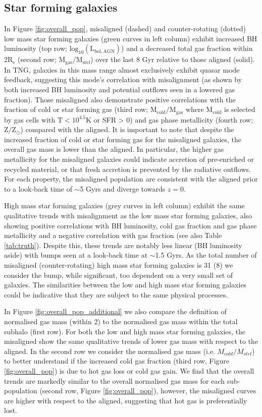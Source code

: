 \subsection{Star forming galaxies}
In Figure \ref{fig:overall_pop}, misaligned (dashed) and counter-rotating (dotted) low mass star forming galaxies (green curves in left column) exhibit increased BH luminosity (top row; $\mathrm{log_{10}(L_{bol, AGN})}$) and a decreased total gas fraction within 2$\mathrm{R_{e}}$ (second row; $\mathrm{M_{gas} / M_{stel}}$) over the last 8 Gyr relative to those aligned (solid). In TNG, galaxies in this mass range almost exclusively exhibit quasar mode feedback, suggesting this mode's correlation with misalignment (as shown by both increased BH luminosity and potential outflows seen in a lowered gas fraction). Those misaligned also demonstrate positive correlations with the fraction of cold or star forming gas (third row; $\mathrm{M_{cold} / M_{gas}}$ where $\mathrm{M_{cold}}$ is selected by gas cells with $\mathrm{T < 10^{4.5}K}$ or SFR > 0) and gas phase metallicity (fourth row; $\mathrm{Z / Z_{\odot}}$) compared with the aligned. 
It is important to note that despite the increased fraction of cold or star forming gas for the misaligned galaxies, the overall gas mass is lower than the aligned. In particular, the higher gas metallicity for the misaligned galaxies could indicate accretion of pre-enriched or recycled material, or that fresh accretion is prevented by the radiative outflows. For each property, the misaligned population are consistent with the aligned prior to a look-back time of $\sim$5 Gyrs and diverge towards $z=0$.

High mass star forming galaxies (grey curves in left column) exhibit the same qualitative trends with misalignment as the low mass star forming galaxies, also showing positive correlations with BH luminosity, cold gas fraction and gas phase metallicity and a negative correlation with gas fraction (see also Table \ref{tab:truth}). Despite this, these trends are notably less linear (BH luminosity aside) with bumps seen at a look-back time at $\sim$1.5 Gyrs. As the total number of misaligned (counter-rotating) high mass star forming galaxies is 31 (8) we consider the bump, while significant, too dependent on a very small set of galaxies. The similarities between the low and high mass star forming galaxies could be indicative that they are subject to the same physical processes. 

In Figure \ref{fig:overall_pop_additional} we also compare the definition of normalised gas mass (within 2\re) to the normalised gas mass within the total subhalo (first row). For both the low and high mass star forming galaxies, the misaligned show the same qualitative trends of lower gas mass with respect to the aligned. In the second row we consider the normalised gas mass (i.e. $M_{cold} / M_{stel}$) to better understand if the increased cold gas fraction (third row, Figure \ref{fig:overall_pop}) is due to hot gas loss or cold gas gain. We find that the overall trends are markedly similar to the overall normalised gas mass for each sub-population (second row, Figure \ref{fig:overall_pop}), however, the misaligned curves are higher with respect to the aligned, suggesting that hot gas is preferentially lost. 

